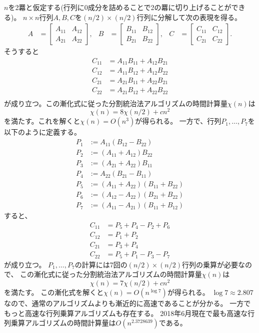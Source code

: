 \documentclass[a4paper,twoside,onecolumn,openany,article,10pt]{memoir}
\theoremstyle{definition}
\theoremstyle{remark}
\begin{document}
$n$を2羃と仮定する(行列に0成分を詰めることで2の羃に切り上げることができる)。
$n\times n$行列$A, B, C$を$(n/2)\times (n/2)$行列に分解して次の表現を得る。
\begin{align*}
A&=\begin{bmatrix}
A_{11}& A_{12}\\
A_{21}& A_{22}
\end{bmatrix},&
B&=\begin{bmatrix}
B_{11}& B_{12}\\
B_{21}& B_{22}
\end{bmatrix},&
C&=\begin{bmatrix}
C_{11}& C_{12}\\
C_{21}& C_{22}
\end{bmatrix}.
\end{align*}
そうすると
\begin{align*}
C_{11} &= A_{11}B_{11} + A_{12}B_{21}\\
C_{12} &= A_{11}B_{12} + A_{12}B_{22}\\
C_{21} &= A_{21}B_{11} + A_{22}B_{21}\\
C_{22} &= A_{21}B_{12} + A_{22}B_{22}\\
\end{align*}
が成り立つ。この漸化式に従った分割統治法アルゴリズムの時間計算量$\chi(n)$は
\begin{equation*}
\chi(n) = 8\chi(n/2) + cn^2
\end{equation*}
を満たす。これを解くと$\chi(n)=O(n^3)$が得られる。
一方で、行列$P_1,\dotsc,P_7$を以下のように定義する。
\begin{align*}
P_1 &:= A_{11}(B_{12}-B_{22})\\
P_2 &:= (A_{11}+A_{12})B_{22}\\
P_3 &:= (A_{21}+A_{22})B_{11}\\
P_4 &:= A_{22}(B_{21}-B_{11})\\
P_5 &:= (A_{11}+A_{22})(B_{11}+B_{22})\\
P_6 &:= (A_{12}-A_{22})(B_{21}+B_{22})\\
P_7 &:= (A_{11}-A_{21})(B_{11}+B_{12})
\end{align*}
すると、
\begin{align*}
C_{11} &=P_5+P_4-P_2+P_6\\
C_{12} &=P_1+P_2\\
C_{21} &=P_3+P_4\\
C_{22} &=P_5+P_1-P_3-P_7
\end{align*}
が成り立つ。
$P_1,\dotsc,P_7$の計算には7回の$(n/2)\times(n/2)$行列の乗算が必要なので、
この漸化式に従った分割統治法アルゴリズムの時間計算量$\chi(n)$は
\begin{equation*}
\chi(n) = 7\chi(n/2) + cn^2
\end{equation*}
を満たす。
この漸化式を解くと$\chi(n)=O(n^{\log 7})$が得られる。
$\log 7 \approx 2.807$なので、通常のアルゴリズムよりも漸近的に高速であることが分かる。
一方でもっと高速な行列乗算アルゴリズムも存在する。
2018年6月現在で最も高速な行列乗算アルゴリズムの時間計算量は$O(n^{2.3728639})$である。
\end{document}
